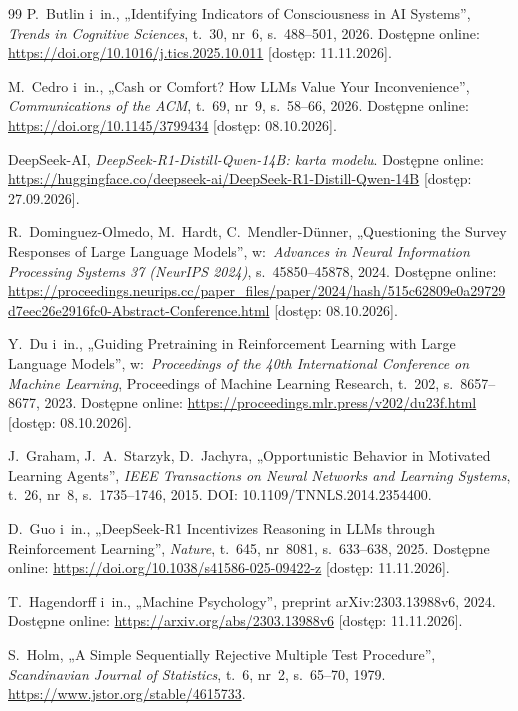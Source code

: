 \begin{thebibliography}{99}
 P.~Butlin i~in., „Identifying Indicators of Consciousness in {AI} Systems”, \textit{Trends in Cognitive Sciences}, t.~30, nr~6, s.~488--501, 2026. Dostępne online: \url{https://doi.org/10.1016/j.tics.2025.10.011} [dostęp: 11.11.2026].

 M.~Cedro i~in., „Cash or Comfort? How {LLMs} Value Your Inconvenience”, \textit{Communications of the ACM}, t.~69, nr~9, s.~58--66, 2026. Dostępne online: \url{https://doi.org/10.1145/3799434} [dostęp: 08.10.2026].

 DeepSeek-AI, \textit{{DeepSeek-R1-Distill-Qwen-14B}: karta modelu}. Dostępne online: \url{https://huggingface.co/deepseek-ai/DeepSeek-R1-Distill-Qwen-14B} [dostęp: 27.09.2026].

 R.~Dominguez-Olmedo, M.~Hardt, C.~Mendler-Dünner, „Questioning the Survey Responses of Large Language Models”, w:~\textit{Advances in Neural Information Processing Systems 37 (NeurIPS 2024)}, s.~45850--45878, 2024. Dostępne online: \url{https://proceedings.neurips.cc/paper_files/paper/2024/hash/515c62809e0a29729d7eec26e2916fc0-Abstract-Conference.html} [dostęp: 08.10.2026].

 Y.~Du i~in., „Guiding Pretraining in Reinforcement Learning with Large Language Models”, w:~\textit{Proceedings of the 40th International Conference on Machine Learning}, Proceedings of Machine Learning Research, t.~202, s.~8657--8677, 2023. Dostępne online: \url{https://proceedings.mlr.press/v202/du23f.html} [dostęp: 08.10.2026].

 J.~Graham, J.~A.~Starzyk, D.~Jachyra, „Opportunistic Behavior in Motivated Learning Agents”, \textit{IEEE Transactions on Neural Networks and Learning Systems}, t.~26, nr~8, s.~1735--1746, 2015. DOI: 10.1109/TNNLS.2014.2354400.

 D.~Guo i~in., „{DeepSeek-R1} Incentivizes Reasoning in {LLMs} through Reinforcement Learning”, \textit{Nature}, t.~645, nr~8081, s.~633--638, 2025. Dostępne online: \url{https://doi.org/10.1038/s41586-025-09422-z} [dostęp: 11.11.2026].

 T.~Hagendorff i~in., „Machine Psychology”, preprint arXiv:2303.13988v6, 2024. Dostępne online: \url{https://arxiv.org/abs/2303.13988v6} [dostęp: 11.11.2026].

 S.~Holm, „A Simple Sequentially Rejective Multiple Test Procedure”, \textit{Scandinavian Journal of Statistics}, t.~6, nr~2, s.~65--70, 1979. \url{https://www.jstor.org/stable/4615733}.


\end{thebibliography}
